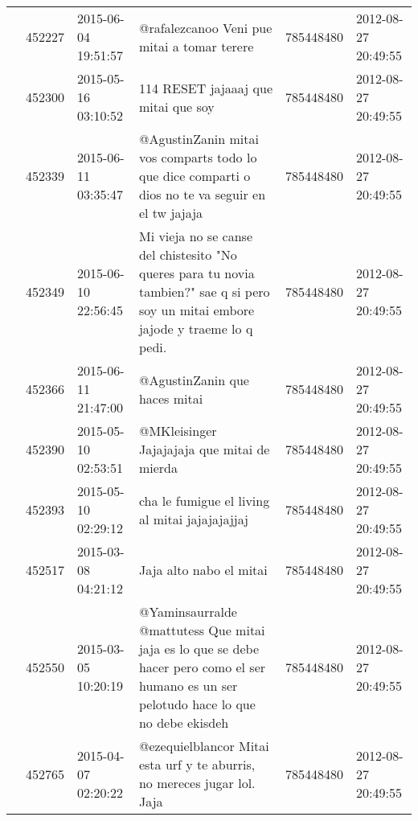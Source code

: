 \begin{tabular}{llllrl}
           & 452227  & 2015-06-04 19:51:57 &                                                                                                  @rafalezcanoo Veni pue mitai a tomar terere &   785448480 & 2012-08-27 20:49:55 \\
           & 452300  & 2015-05-16 03:10:52 &                                                                                                          114 RESET jajaaaj que mitai que soy &   785448480 & 2012-08-27 20:49:55 \\
           & 452339  & 2015-06-11 03:35:47 &                                            @AgustinZanin mitai vos comparts todo lo que dice comparti o dios no te va seguir en el tw jajaja &   785448480 & 2012-08-27 20:49:55 \\
           & 452349  & 2015-06-10 22:56:45 &          Mi vieja no se canse del chistesito "No queres para tu novia tambien?" sae q si pero soy un mitai embore jajode y traeme lo q pedi. &   785448480 & 2012-08-27 20:49:55 \\
           & 452366  & 2015-06-11 21:47:00 &                                                                                                                @AgustinZanin que haces mitai &   785448480 & 2012-08-27 20:49:55 \\
           & 452390  & 2015-05-10 02:53:51 &                                                                                                  @MKleisinger Jajajajaja que mitai de mierda &   785448480 & 2012-08-27 20:49:55 \\
           & 452393  & 2015-05-10 02:29:12 &                                                                                               cha le fumigue el living al mitai jajajajajjaj &   785448480 & 2012-08-27 20:49:55 \\
           & 452517  & 2015-03-08 04:21:12 &                                                                                                                      Jaja alto nabo el mitai &   785448480 & 2012-08-27 20:49:55 \\
           & 452550  & 2015-03-05 10:20:19 &     @Yaminsaurralde @mattutess Que mitai jaja es lo que se debe hacer pero como el ser humano es un ser pelotudo hace lo que no debe ekisdeh &   785448480 & 2012-08-27 20:49:55 \\
           & 452765  & 2015-04-07 02:20:22 &                                                                     @ezequielblancor Mitai esta urf y te aburris, no mereces jugar lol. Jaja &   785448480 & 2012-08-27 20:49:55 \\

\end{tabular}
